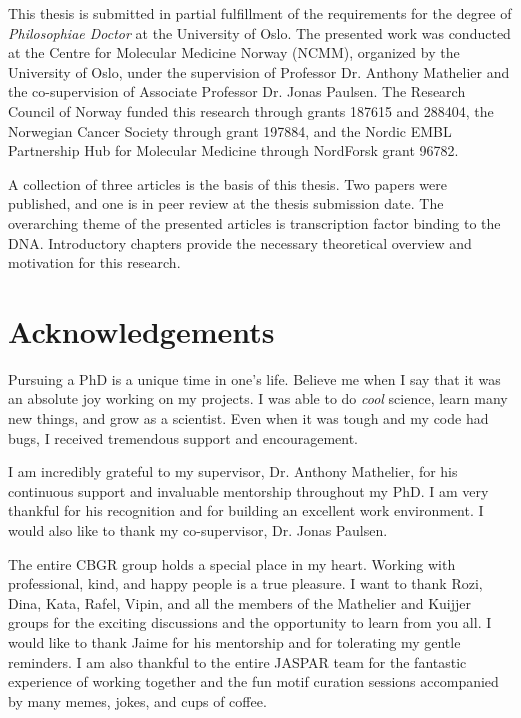 \begin{preface}

This thesis is submitted in partial fulfillment of the requirements for the degree of \textit{Philosophiae Doctor} at the University of Oslo. The presented work was conducted at the Centre for Molecular Medicine Norway (NCMM), organized by the University of Oslo, under the supervision of Professor Dr. Anthony Mathelier and the co-supervision of Associate Professor Dr. Jonas Paulsen. The Research Council of Norway funded this research through grants 187615 and 288404, the Norwegian Cancer Society through grant 197884, and the Nordic EMBL Partnership Hub for Molecular Medicine through NordForsk grant 96782.

A collection of three articles is the basis of this thesis. Two papers were published, and one is in peer review at the thesis submission date. The overarching theme of the presented articles is transcription factor binding to the DNA. Introductory chapters provide the necessary theoretical overview and motivation for this research.

    \section*{Acknowledgements}

    Pursuing a PhD is a unique time in one's life. Believe me when I say that it was an absolute joy working on my projects. I was able to do \textit{cool} science, learn many new things, and grow as a scientist. Even when it was tough and my code had bugs, I received tremendous support and encouragement.

    I am incredibly grateful to my supervisor, Dr. Anthony Mathelier, for his continuous support and invaluable mentorship throughout my PhD. I am very thankful for his recognition and for building an excellent work environment. I would also like to thank my co-supervisor, Dr. Jonas Paulsen.

    The entire CBGR group holds a special place in my heart. Working with professional, kind, and happy people is a true pleasure. I want to thank Rozi, Dina, Kata, Rafel, Vipin, and all the members of the Mathelier and Kuijjer groups for the exciting discussions and the opportunity to learn from you all. I would like to thank Jaime for his mentorship and for tolerating my gentle reminders. I am also thankful to the entire JASPAR team for the fantastic experience of working together and the fun motif curation sessions accompanied by many memes, jokes, and cups of coffee.


\end{preface}
